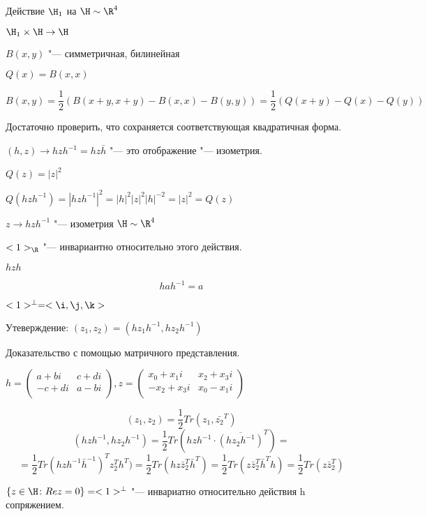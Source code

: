 Действие $\H_1$ на $\H \sim \R^4$

$\H_1 \times \H \to \H$

$B(x, y)$ "--- симметричная, билинейная 

$Q(x) = B(x, x)$

$$B(x, y) = \frac{1}{2}(B(x + y, x + y) - B(x, x) - B(y, y)) = \frac{1}{2}(Q(x + y) - Q(x) - Q(y))$$

Достаточно проверить, что сохраняется соответствующая квадратичная форма. 

$(h, z) \to hzh^{-1}  = hz\bar h$  "--- это отображение "--- изометрия. 

$Q(z) = |z|^2$

$Q(hzh^{-1}) = |hzh^{-1}|^2 = |h|^2|z|^2|h|^{-2} = |z|^2 = Q(z)$ 

$z \to hzh^{-1}$ "--- изометрия $\H \sim \R^4$

$<1>_{\R}$ "--- инвариантно относительно этого действия. 

$hzh$

$$hah^{-1} = a$$

$<1>^{\bot} = <\i, \j, \k>$

Утеверждение: $(z_1, z_2) = (hz_1h^{-1}, hz_2h^{-1})$

\begin{Rem}
Доказательство с помощью матричного представления. 

$h = \begin{pmatrix}
a+bi & c + di\\
-c + di & a - bi\\
\end{pmatrix}, 
z = 
\begin{pmatrix}
x_0 + x_1i & x_2 + x_3i\\
-x_2 + x_3i & x_0 - x_1i\\
\end{pmatrix}
$

$$(z_1, z_2) = \frac{1}{2}Tr(z_1, \bar{z_2}^{T})$$
$$(hzh^{-1}, hz_2h^{-1}) = \frac{1}{2}Tr(hzh^{-1}\cdot \overline{(h z_2 h^{-1})}^{T}) = $$
$$= \frac{1}{2}Tr(hzh^{-1}\bar{h}^{-1})^{T}z_2^Th^T) = \frac{1}{2}Tr(hz\bar z_2^T \bar h^{T}) = \frac{1}{2}Tr(z\bar z_2^{T}\bar h^{T}h) = \frac{1}{2}Tr(z\bar z_2^T)$$

\end{Rem}

\begin{conseq}
 $\{z \in \H\colon Re z = 0\} = <1>^{\bot}$ "--- инвариатно 
 относительно действия h сопряжением.
\end{conseq}

